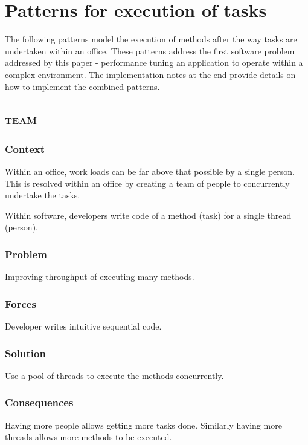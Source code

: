 \documentclass[prodmode]{style/acmlarge}
\begin{document}
\section{Patterns for execution of tasks}

The following patterns model the execution of methods after the way tasks are
undertaken within an office.  These patterns address the first software problem
addressed by this paper - performance tuning an application to operate within a
complex environment.  The implementation notes at the end provide details on how
to implement the combined patterns.


\subsection{\textsc{\textbf{team}}}

\subsubsection*{Context} Within an office, work loads can be far above that
possible by a single person. This is resolved within an office by creating a
team of people to concurrently undertake the tasks.

Within software, developers write code of a method (task) for a single thread
(person).

\subsubsection*{\textbf{Problem}} Improving throughput of executing many methods.

\subsubsection*{Forces} Developer writes intuitive sequential code.

\subsubsection*{\textbf{Solution}} Use a pool of threads to execute the methods
concurrently.

\subsubsection*{Consequences} Having more people allows getting more tasks done.
Similarly having more threads allows more methods to be executed.
\end{document}
